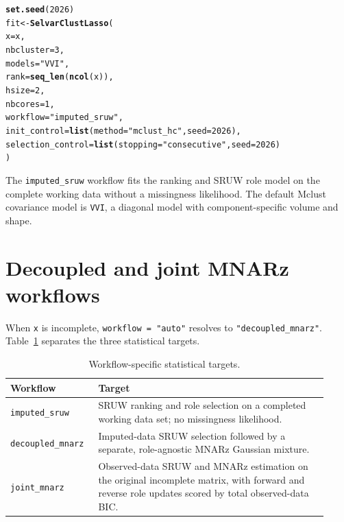 \documentclass[10pt]{article}\usepackage[]{graphicx}\usepackage[]{xcolor}
\makeatletter
\newcommand{\hlnum}[1]{\textcolor[rgb]{0.686,0.059,0.569}{#1}}%
\newcommand{\hlsng}[1]{\textcolor[rgb]{0.192,0.494,0.8}{#1}}%
\newcommand{\hldef}[1]{\textcolor[rgb]{0.345,0.345,0.345}{#1}}%
\newcommand{\hlkwb}[1]{\textcolor[rgb]{0.69,0.353,0.396}{#1}}%
\newcommand{\hlkwc}[1]{\textcolor[rgb]{0.333,0.667,0.333}{#1}}%
\newcommand{\hlkwd}[1]{\textcolor[rgb]{0.737,0.353,0.396}{\textbf{#1}}}%
\newenvironment{kframe}{%
 \def\at@end@of@kframe{}%
 \ifinner\ifhmode%
  \def\at@end@of@kframe{\end{minipage}}%
  \begin{minipage}{\columnwidth}%
 \fi\fi%
 \def\FrameCommand##1{\hskip\@totalleftmargin \hskip-\fboxsep
 \colorbox{shadecolor}{##1}\hskip-\fboxsep
     \hskip-\linewidth \hskip-\@totalleftmargin \hskip\columnwidth}%
 \MakeFramed {\advance\hsize-\width
   \@totalleftmargin\z@ \linewidth\hsize
   \@setminipage}}%
 {\par\unskip\endMakeFramed%
 \at@end@of@kframe}
\newenvironment{knitrout}{}{} %
\makeatother
\begin{document}
\begin{knitrout}
\color{fgcolor}\begin{kframe}
\begin{alltt}
\hlkwd{set.seed}\hldef{(}\hlnum{2026}\hldef{)}
\hldef{fit} \hlkwb{<-} \hlkwd{SelvarClustLasso}\hldef{(}
 \hlkwc{x} \hldef{= x,}
 \hlkwc{nbcluster} \hldef{=} \hlnum{3}\hldef{,}
 \hlkwc{models} \hldef{=} \hlsng{"VVI"}\hldef{,}
 \hlkwc{rank} \hldef{=} \hlkwd{seq_len}\hldef{(}\hlkwd{ncol}\hldef{(x)),}
 \hlkwc{hsize} \hldef{=} \hlnum{2}\hldef{,}
 \hlkwc{nbcores} \hldef{=} \hlnum{1}\hldef{,}
 \hlkwc{workflow} \hldef{=} \hlsng{"imputed_sruw"}\hldef{,}
 \hlkwc{init_control} \hldef{=} \hlkwd{list}\hldef{(}\hlkwc{method} \hldef{=} \hlsng{"mclust_hc"}\hldef{,} \hlkwc{seed} \hldef{=} \hlnum{2026}\hldef{),}
 \hlkwc{selection_control} \hldef{=} \hlkwd{list}\hldef{(}\hlkwc{stopping} \hldef{=} \hlsng{"consecutive"}\hldef{,} \hlkwc{seed} \hldef{=} \hlnum{2026}\hldef{)}
\hldef{)}
\end{alltt}


{\ttfamily\noindent\bfseries{}}\end{kframe}
\end{knitrout}

The \texttt{imputed\_sruw} workflow fits the ranking and SRUW role model on the
complete working data without a missingness likelihood. The
default Mclust covariance model is \texttt{VVI}, a diagonal model with
component-specific volume and shape.

\section{Decoupled and joint MNARz workflows}

When \texttt{x} is incomplete, \texttt{workflow = "auto"} resolves to
\texttt{"decoupled\_mnarz"}. Table~\ref{tab:workflows} separates the three
statistical targets.

\begin{table}[H]
\centering
\small
\caption{Workflow-specific statistical targets.}
\label{tab:workflows}
\begin{tabular}{@{}>{\raggedright\arraybackslash}p{0.24\linewidth}
          >{\raggedright\arraybackslash}p{0.68\linewidth}@{}}
\toprule
Workflow & Target \\
\midrule
\texttt{imputed\_sruw} &
SRUW ranking and role selection on a completed working data set; no
missingness likelihood. \\
\texttt{decoupled\_mnarz} &
Imputed-data SRUW selection followed by a separate, role-agnostic MNARz
Gaussian mixture. \\
\texttt{joint\_mnarz} &
Observed-data SRUW and MNARz estimation on the original incomplete matrix,
with forward and reverse role updates scored by total observed-data BIC. \\
\bottomrule
\end{tabular}
\end{table}
\end{document}
